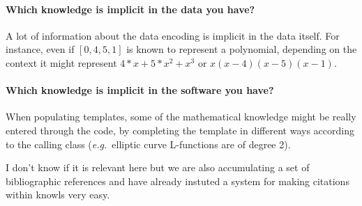 \paragraph{Which knowledge is implicit in the data you have?}
A lot of information about the data encoding is implicit in the data itself. For instance, even if $[0,4,5,1]$ is known to represent a polynomial, depending on the context it might represent $4*x+5*x^2+x^3$ or $x(x-4)(x-5)(x-1)$.

\paragraph{ Which knowledge is implicit in the software you have?}

When populating templates, some of the mathematical knowledge might be really entered through the code, by completing the template in different ways according to the calling class (\emph{e.g.}~elliptic curve L-functions are of degree 2).

I don't know if it is relevant here but we are also accumulating a set of
bibliographic references and have already instuted a system for making
citations within knowls very easy.

